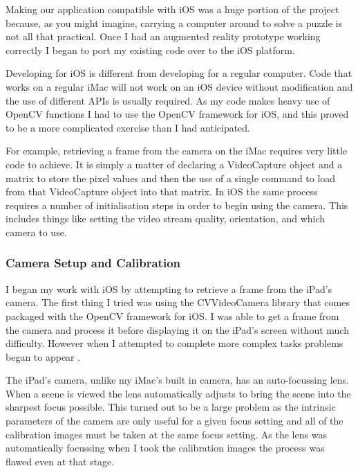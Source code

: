 \documentclass{article}
\begin{document}
Making our application compatible with iOS was a huge portion of the project because, as you might imagine, carrying a computer around to solve a puzzle is not all that practical. Once I had an augmented reality prototype working correctly I began to port my existing code over to the iOS platform. \par

Developing for iOS is different from developing for a regular computer. Code that works on a regular iMac will not work on an iOS device without modification and the use of different APIs is usually required. As my code makes heavy use of OpenCV functions I had to use the OpenCV framework for iOS, and this proved to be a more complicated exercise than I had anticipated. \par

For example, retrieving a frame from the camera on the iMac requires very little code to achieve. It is simply a matter of declaring a VideoCapture object and a matrix to store the pixel values and then the use of a single command to load from that VideoCapture object into that matrix. In iOS the same process requires a number of initialisation steps in order to begin using the camera. This includes things like setting the video stream quality, orientation, and which camera to use. \par

\subsubsection{Camera Setup and Calibration}

I began my work with iOS by attempting to retrieve a frame from the iPad's camera. The first thing I tried was using the CVVideoCamera library that comes packaged with the OpenCV framework for iOS. I was able to get a frame from the camera and process it before displaying it on the iPad's screen without much difficulty. However when I attempted to complete more complex tasks problems began to appear \cite{iOS}. \par

The iPad's camera, unlike my iMac's built in camera, has an auto-focussing lens. When a scene is viewed the lens automatically adjusts to bring the scene into the sharpest focus possible. This turned out to be a large problem as the intrinsic parameters of the camera are only useful for a given focus setting and all of the calibration images must be taken at the same focus setting. As the lens was automatically focussing when I took the calibration images the process was flawed even at that stage. \par
\end{document}
